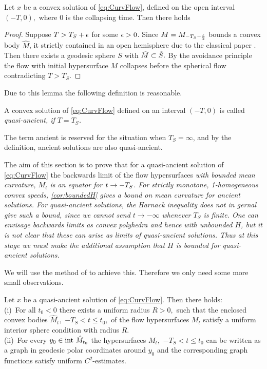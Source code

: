 \documentclass{amsart}
\begin{document}
\begin{lemma}
Let $x$ be a convex solution of \eqref{eq:CurvFlow}, defined on the open interval $(-T,0),$ where $0$ is the collapsing time. Then
there holds
\end{lemma}

\begin{proof}
Suppose $T>T_S+\epsilon$ for some $\epsilon>0$. Since $M=M_{-T_S-\frac{\epsilon}{2}}$ bounds a convex body $\hat{M}$, it strictly contained in an open hemisphere due to the classical paper \cite{CarmoWarner:/1970}. Then there exists a geodesic sphere $S$ with $\hat{M}\subset\hat{S}.$ By the avoidance principle the flow with initial hypersurface $M$ collapses before the spherical flow contradicting $T>T_S$.
\end{proof}

Due to this lemma the following definition is reasonable.

\begin{definition}
A convex solution of \eqref{eq:CurvFlow} defined on an interval $(-T,0)$ is called \it{quasi-ancient}, if $T=T_S$.
\end{definition}

The term ancient is reserved for the situation when \(T_S=\infty\), and by the definition, ancient solutions are also quasi-ancient.

The aim of this section is to prove that for a quasi-ancient solution of \eqref{eq:CurvFlow} the backwards limit of the flow hypersurfaces \it{with bounded mean curvature}, $M_t$ is an equator for $t\rightarrow -T_S$. For strictly monotone, 1-homogeneous convex speeds, \cref{cor:boundedH} gives a bound on mean curvature for ancient solutions. For quasi-ancient solutions, the Harnack inequality does not in gernal give such a bound, since we cannot send \(t \to -\infty\) whenever \(T_S\) is finite. One can envisage backwards limits as convex polyhedra and hence with unbounded \(H\), but it is not clear that these can arise as limits of quasi-ancient solutions. Thus at this stage we must make the additional assumption that \(H\) is bounded for quasi-ancient solutions.

We will use the method of \cite{MakowskiScheuer:/2013} to achieve this. Therefore we only need some more small observations.

\begin{lemma}\label{ISC}
Let $x$ be a quasi-ancient solution of \eqref{eq:CurvFlow}. Then there holds:\\

(i)~For all $t_0<0$ there exists a uniform radius $R>0,$ such that the enclosed convex bodies $\hat{M}_t,$ $-T_S<t\leq t_0,$ of the flow hypersurfaces $M_t$ satisfy a uniform interior sphere condition with radius $R.$\\

(ii)~For every $y_0\in\mathrm{int}~\hat{M}_{t_0}$ the hypersurfaces $M_t,$ $-T_S<t\leq t_0$ can be written as a graph in geodesic polar coordinates around $y_0$ and the corresponding graph functions satisfy uniform $C^2$-estimates.
\end{lemma}
\end{document}
